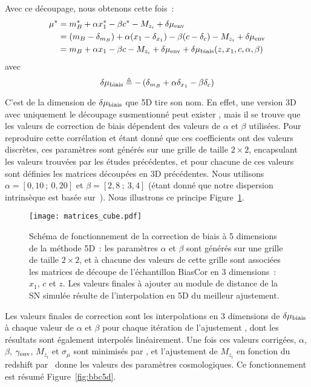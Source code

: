 \documentclass[../main/main.tex]{subfiles}
\begin{document}
Avec ce découpage, nous obtenons cette fois~:
\begin{align}\label{eq:mu5D}
    \mu^* & = m_B^* + \alpha x_1^* - \beta c^* - M_{z_i}
            + \delta\mu_{\rm env} \nonumber\\
          & = (m_B - \delta_{m_B}) + \alpha (x_1 - \delta_{x_1}) - \beta(c-\delta_c)
            - M_{z_i} + \delta\mu_{\rm env} \nonumber\\
          & = m_B + \alpha x_1 - \beta c - M_{z_i}
            + \delta\mu_{\rm env} + \delta\mu_{\rm biais}(z, x_1, c, \alpha, \beta)
\end{align}
avec
\begin{equation}\label{eq:bias5D}
    \delta\mu_{\rm biais} \triangleq
        - \left(\delta_{m_B} + \alpha \delta_{x_1} - \beta\delta_c\right)
\end{equation}

C'est de la dimension de $\delta\mu_{\rm biais}$ que \bbc5D tire son nom. En
effet, une version 3D avec uniquement le découpage susmentionné peut exister
\citep{scolnic2016}, mais il se trouve que les valeurs de correction de biais
dépendent des valeurs de $\alpha$ et $\beta$ utilisées. Pour reproduire cette
corrélation et étant donné que ces coefficients ont des valeurs discrètes, ces
paramètres sont générés sur une grille de taille $2\times2$, encapsulant les
valeurs trouvées par les études précédentes, et pour chacune de ces valeurs sont
définies les matrices découpées en 3D précédentes. Nous utilisons $\alpha =
[0,10~;~0,20]$ et $\beta = [2,8~;~3,4]$ (étant donné que notre dispersion
intrinsèque est basée sur~). Nous illustrons ce principe
Figure~\ref{fig:mat5D}.

\begin{figure}[ht]
    \centering
    \texttt{[image: matrices\_cube.pdf]}
    \caption[Schéma de fonctionnement de la correction de biais à 5 dimensions
    de la méthode \bbc5D]{Schéma de fonctionnement de la correction de biais à 5
        dimensions de la méthode \bbc5D~: les paramètres $\alpha$ et $\beta$
        sont générés sur une grille de taille $2\times2$, et à chacune des
        valeurs de cette grille sont associées les matrices de découpe de
    l'échantillon BiasCor en 3 dimensions~: $x_1$, $c$ et $z$. Les valeurs
finales à ajouter au module de distance de la SN simulée résulte de
l'interpolation en 5D du meilleur ajustement.}
    \label{fig:mat5D}
\end{figure}

Les valeurs finales de correction sont les interpolations en 3 dimensions de
$\delta\mu_{\rm biais}$ à chaque valeur de $\alpha$ et $\beta$ pour chaque
itération de l'ajustement \bbc, dont les résultats sont également interpolés
linéairement. Une fois ces valeurs corrigées, $\alpha$, $\beta$, $\gamma_{\rm
env}$, $M_{z_i}$ et $\sigma_{\mu}$ sont minimisés par \saltmu, et l'ajustement
de $M_{z_i}$ en fonction du redshift par \wfit\ donne les valeurs des paramètres
cosmologiques. Ce fonctionnement est résumé Figure~\ref{fig:bbc5d}.
\end{document}
